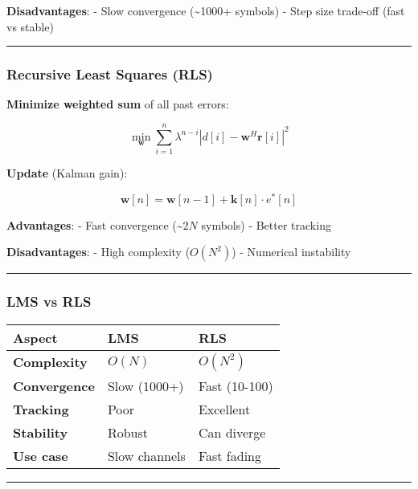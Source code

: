 \textbf{Disadvantages}: - Slow convergence (\textasciitilde1000+
symbols) - Step size trade-off (fast vs stable)

\begin{center}\rule{0.5\linewidth}{0.5pt}\end{center}

\subsubsection{Recursive Least Squares
(RLS)}\label{recursive-least-squares-rls}

\textbf{Minimize weighted sum} of all past errors:

\[
\min_{\mathbf{w}} \sum_{i=1}^{n} \lambda^{n-i} |d[i] - \mathbf{w}^H \mathbf{r}[i]|^2
\]

\textbf{Update} (Kalman gain):

\[
\mathbf{w}[n] = \mathbf{w}[n-1] + \mathbf{k}[n] \cdot e^*[n]
\]

\textbf{Advantages}: - Fast convergence (\textasciitilde{}\(2N\)
symbols) - Better tracking

\textbf{Disadvantages}: - High complexity (\(O(N^2)\)) - Numerical
instability

\begin{center}\rule{0.5\linewidth}{0.5pt}\end{center}

\subsubsection{LMS vs RLS}\label{lms-vs-rls}

{\def\LTcaptype{} %
\begin{longtable}[]{@{}lll@{}}
\toprule\noalign{}
Aspect & LMS & RLS \\
\midrule\noalign{}
\endhead
\bottomrule\noalign{}
\endlastfoot
\textbf{Complexity} & \(O(N)\) & \(O(N^2)\) \\
\textbf{Convergence} & Slow (1000+) & Fast (10-100) \\
\textbf{Tracking} & Poor & Excellent \\
\textbf{Stability} & Robust & Can diverge \\
\textbf{Use case} & Slow channels & Fast fading \\
\end{longtable}
}

\begin{center}\rule{0.5\linewidth}{0.5pt}\end{center}

